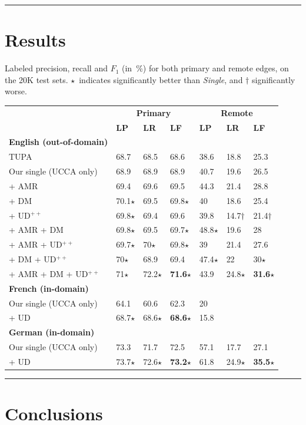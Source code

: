 \documentclass[a0,portrait]{a0poster}
\begin{document}
\begin{multicols}{2}
\vspace{5cm}


\hrule


\section*{Results}

Labeled precision, recall and $F_1$ (in~\%) for both primary and remote edges,
on the 20K test sets.
$\star$~indicates significantly better than \textit{Single},
and $\dagger$ significantly worse.

\begin{center}
\setlength\tabcolsep{1cm}
\begin{tabular}{l|lll|lll}
& \multicolumn{3}{c|}{\bf Primary} & \multicolumn{3}{c}{\bf Remote} \\
& \textbf{LP} & \textbf{LR} & \textbf{LF}
& \textbf{LP} & \textbf{LR} & \textbf{LF} \\
\hline
\bf English (out-of-domain) & \\
TUPA \cite{hershcovich2017a}
& 68.7 & 68.5 & 68.6 & 38.6 & 18.8 & 25.3 \\
Our single (UCCA only)
& 68.9 & 68.9 & 68.9 & 40.7 & 19.6 & 26.5 \\
\cline{1-1}
+ AMR
& 69.4 & 69.6 & 69.5 & 44.3 & 21.4 & 28.8 \\
+ DM
& 70.1$\star$ & 69.5 & 69.8$\star$ & 40 & 18.6 & 25.4 \\
+ UD$^{++}$
& 69.8$\star$ & 69.4 & 69.6 & 39.8 & 14.7$\dagger$ & 21.4$\dagger$ \\
+ AMR + DM
& 69.8$\star$ & 69.5 & 69.7$\star$ & 48.8$\star$ & 19.6 & 28 \\
+ AMR + UD$^{++}$
& 69.7$\star$ & 70$\star$ & 69.8$\star$ & 39 & 21.4 & 27.6 \\
+ DM + UD$^{++}$
& 70$\star$ & 68.9 & 69.4 & 47.4$\star$ & 22 & 30$\star$ \\
+ AMR + DM + UD$^{++}$
& 71$\star$ & 72.2$\star$ & \textbf{71.6}$\star$ & 43.9 & 24.8$\star$ & \textbf{31.6}$\star$ \\
\hline
\bf French (in-domain) & \\
Our single (UCCA only) & 64.1 & 60.6 & 62.3 & 20 & \enskip 5.7 & \enskip 8.8 \\
+ UD & 68.7$\star$ & 68.6$\star$ & \textbf{68.6}$\star$ & 15.8 & \enskip 5.7 & \enskip 8.3 \\
\hline
\bf German (in-domain) & \\
Our single (UCCA only) & 73.3 & 71.7 & 72.5 & 57.1 & 17.7 & 27.1 \\
+ UD & 73.7$\star$ & 72.6$\star$ & \textbf{73.2}$\star$ & 61.8 & 24.9$\star$ & \textbf{35.5}$\star$
\end{tabular}
\end{center}

\hrule


\section*{Conclusions}


\color{DarkSlateGray}
\tiny



\end{multicols}
\end{document}
